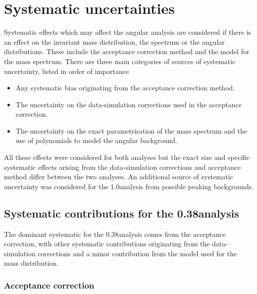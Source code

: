 \section{Systematic uncertainties}
\label{sec:kstmm:sys}

Systematic effects which may affect the angular analysis are considered if there is an effect on 
the \kpimm invariant mass distribution, the \qsq spectrum or the angular distributions.
These include the acceptance correction method and the model for the \Bd mass spectrum.
There are three main categories of sources of systematic uncertainty, listed in order of importance
\begin{itemize}
\item Any systematic bias originating from the acceptance correction method.
\item The uncertainty on the data-simulation corrections used in the acceptance correction.
\item The uncertainty on the exact parametrisation of the \Bd mass spectrum and the use of polynomials to model the angular background.
\end{itemize}
All these effects were considered for both analyses but the exact size and specific systematic effects arising from the 
data-simulation corrections and acceptance method differ between the two analyses.
An additional source of systematic uncertainty was considered for the 1.0\invfb analysis from possible peaking backgrounds.


\subsection{Systematic contributions for the 0.38\invfb analysis}

The dominant systematic for the 0.38\invfb analysis comes from the acceptance correction, with other systematic contributions 
originating from the data-simulation corrections and a minor contribution from the model used for the \Bd mass distribution.

\subsubsection{Acceptance correction}

